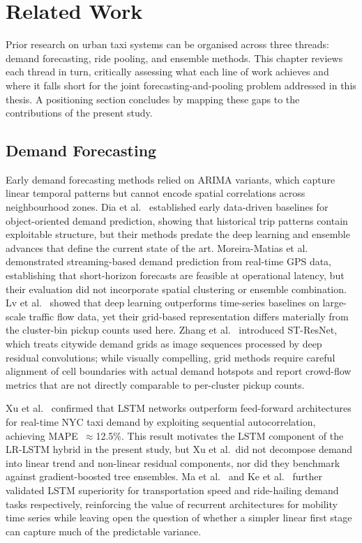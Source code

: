 \chapter{Related Work}
\label{ch:related}

Prior research on urban taxi systems can be organised across three threads: demand forecasting, ride pooling, and ensemble methods. This chapter reviews each thread in turn, critically assessing what each line of work achieves and where it falls short for the joint forecasting-and-pooling problem addressed in this thesis. A positioning section concludes by mapping these gaps to the contributions of the present study.

\section{Demand Forecasting}

Early demand forecasting methods relied on ARIMA variants, which capture linear temporal patterns but cannot encode spatial correlations across neighbourhood zones. Dia et al.~\parencite{dia2002object} established early data-driven baselines for object-oriented demand prediction, showing that historical trip patterns contain exploitable structure, but their methods predate the deep learning and ensemble advances that define the current state of the art. Moreira-Matias et al.~\parencite{moreira2013predicting} demonstrated streaming-based demand prediction from real-time GPS data, establishing that short-horizon forecasts are feasible at operational latency, but their evaluation did not incorporate spatial clustering or ensemble combination. Lv et al.~\parencite{lv2015traffic} showed that deep learning outperforms time-series baselines on large-scale traffic flow data, yet their grid-based representation differs materially from the cluster-bin pickup counts used here. Zhang et al.~\parencite{zhang2017deep} introduced ST-ResNet, which treats citywide demand grids as image sequences processed by deep residual convolutions; while visually compelling, grid methods require careful alignment of cell boundaries with actual demand hotspots and report crowd-flow metrics that are not directly comparable to per-cluster pickup counts.

Xu et al.~\parencite{xu2017realtime} confirmed that LSTM networks outperform feed-forward architectures for real-time NYC taxi demand by exploiting sequential autocorrelation, achieving MAPE~$\approx$12.5\%. This result motivates the LSTM component of the LR-LSTM hybrid in the present study, but Xu et al.\ did not decompose demand into linear trend and non-linear residual components, nor did they benchmark against gradient-boosted tree ensembles. Ma et al.~\parencite{ma2015long} and Ke et al.~\parencite{ke2017short} further validated LSTM superiority for transportation speed and ride-hailing demand tasks respectively, reinforcing the value of recurrent architectures for mobility time series while leaving open the question of whether a simpler linear first stage can capture much of the predictable variance.

